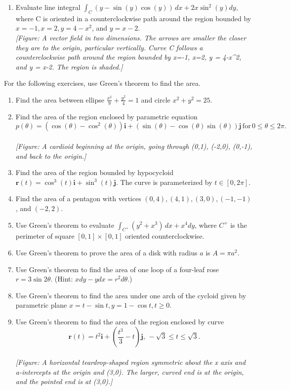 \documentclass{exercises}
\begin{document}
\begin{enumerate}[resume]
\item Evaluate line integral $\int_{C}(y-\sin(y)\cos(y))\,dx+2x\sin^{2}(y)dy$, where C is oriented in a counterclockwise path around the region bounded by $x=-1,x=2,y=4-x^{2}$, and $y=x-2$. \\ \textit{[Figure: A vector field in two dimensions. The arrows are smaller the closer they are to the origin, particular vertically. Curve C follows a counterclockwise path around the region bounded by x=-1, x=2, y = 4-x\textasciicircum{}2, and y = x-2. The region is shaded.]}
\end{enumerate}

For the following exercises, use Green's theorem to find the area.

\begin{enumerate}[resume]
\item Find the area between ellipse $\frac{x^{2}}{9}+\frac{y^{2}}{4}=1$ and circle $x^{2}+y^{2}=25$.
\item Find the area of the region enclosed by parametric equation \[p(\theta)=(\cos(\theta)-\cos^{2}(\theta))\mathbf{i}+(\sin(\theta)-\cos(\theta)\sin(\theta))\mathbf{j}\,\text{for}\,0\le \theta \le2\pi.\] \\ \textit{[Figure: A cardioid beginning at the origin, going through (0,1), (-2,0), (0,-1), and back to the origin.]}
\item Find the area of the region bounded by hypocycloid $\mathbf{r}(t)=\cos^{3}(t)\mathbf{i}+\sin^{3}(t)\mathbf{j}$. The curve is parameterized by $t\in[0,2\pi]$.
\item Find the area of a pentagon with vertices $(0,4),(4,1),(3,0),(-1,-1)$, and $(-2,2)$.
\item Use Green's theorem to evaluate $\int_{C^{+}}(y^{2}+x^{3})\,dx+x^{4}dy$, where $C^{+}$ is the perimeter of square $[0,1]\times [0,1]$ oriented counterclockwise.
\item Use Green's theorem to prove the area of a disk with radius $a$ is $A=\pi a^{2}$.
\item Use Green's theorem to find the area of one loop of a four-leaf rose $r=3\sin 2\theta$. (Hint: $xdy-ydx=r^{2}d\theta$.)
\item Use Green's theorem to find the area under one arch of the cycloid given by parametric plane $x=t-\sin t,y=1-\cos t,t\ge0$.
\item Use Green's theorem to find the area of the region enclosed by curve \[\mathbf{r}(t)=t^{2}\mathbf{i}+(\frac{t^{3}}{3}-t)\mathbf{j},\,-\sqrt{3}\le t\le \sqrt{3}.\] \\ \textit{[Figure: A horizontal teardrop-shaped region symmetric about the x axis and a-intercepts at the origin and (3,0). The larger, curved end is at the origin, and the pointed end is at (3,0).]}

\end{enumerate}
\end{document}
